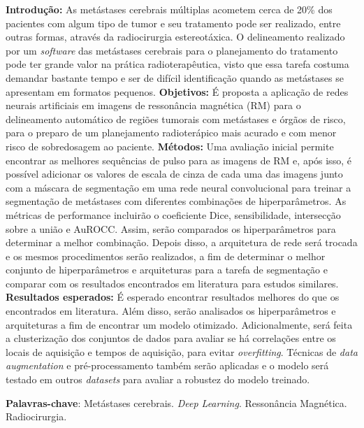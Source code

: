 
\begin{center}
\imprimirtitulo
\end{center}

\begin{resumo}
\textbf{Introdução:} As metástases cerebrais múltiplas acometem cerca de 20\% dos pacientes com algum tipo de tumor e seu tratamento pode ser realizado, entre outras formas, através da radiocirurgia estereotáxica. O delineamento realizado por um \textit{software} das metástases cerebrais para o planejamento do tratamento pode ter grande valor na prática radioterapêutica, visto que essa tarefa costuma demandar bastante tempo e ser de difícil identificação quando as metástases se apresentam em formatos pequenos. \textbf{Objetivos:} É proposta a aplicação de redes neurais artificiais em imagens de ressonância magnética (RM) para o delineamento automático de regiões tumorais com metástases e órgãos de risco, para o preparo de um planejamento radioterápico mais acurado e com menor risco de sobredosagem ao paciente. \textbf{Métodos:} Uma avaliação inicial permite encontrar as melhores sequências de pulso para as imagens de RM e, após isso, é possível adicionar os valores de escala de cinza de cada uma das imagens junto com a máscara de segmentação em uma rede neural convolucional para treinar a segmentação de metástases com diferentes combinações de hiperparâmetros. As métricas de performance incluirão o coeficiente Dice, sensibilidade, intersecção sobre a união e AuROCC. Assim, serão comparados os hiperparâmetros para determinar a melhor combinação. Depois disso, a arquitetura de rede será trocada e os mesmos procedimentos serão realizados, a fim de determinar o melhor conjunto de hiperparâmetros e arquiteturas para a tarefa de segmentação e comparar com os resultados encontrados em literatura para estudos similares. \textbf{Resultados esperados:} É esperado encontrar resultados melhores do que os encontrados em literatura. Além disso, serão analisados os hiperparâmetros e arquiteturas a fim de encontrar um modelo otimizado. Adicionalmente, será feita a clusterização dos conjuntos de dados para avaliar se há correlações entre os locais de aquisição e tempos de aquisição, para evitar \textit{overfitting}. Técnicas de \textit{data augmentation} e pré-processamento também serão aplicadas e o modelo será testado em outros \textit{datasets} para avaliar a robustez do modelo treinado.

\textbf{Palavras-chave}: Metástases cerebrais. \textit{Deep Learning}. Ressonância Magnética. Radiocirurgia.

\end{resumo}
